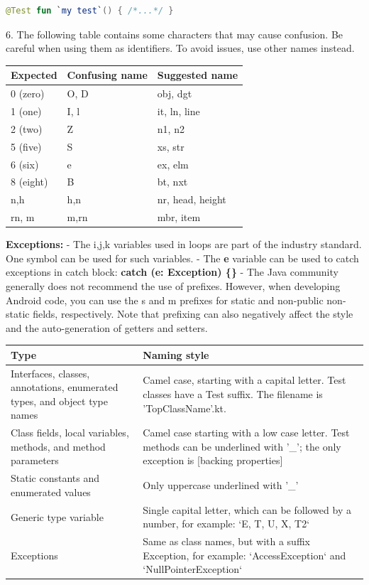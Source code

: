 \begin{lstlisting}[language=Kotlin]
 @Test fun `my test`() { /*...*/ }
\end{lstlisting}
6.  The following table contains some characters that may cause confusion. Be careful when using them as identifiers. To avoid issues, use other names instead.
\begin{center}
\begin{tabular}{ |p{5.0cm}|p{5.0cm}|p{5.0cm}| }
\hline
Expected&Confusing name&Suggested name\\
\hline
 0 (zero)      & O, D                     & obj, dgt         \\
 1 (one)       & I, l                     & it, ln, line     \\
 2 (two)       & Z                        & n1, n2           \\
 5 (five)      & S                        & xs, str          \\
 6 (six)       & e                        & ex, elm          \\
 8 (eight)     & B                        & bt, nxt          \\
 n,h           & h,n                      & nr, head, height \\
 rn, m         & m,rn                     & mbr, item        \\
\hline
\end{tabular}
\end{center}
\textbf{Exceptions:}
- The i,j,k variables used in loops are part of the industry standard. One symbol can be used for such variables.
- The \textbf{e} variable can be used to catch exceptions in catch block: \textbf{catch (e: Exception) \{\}}
- The Java community generally does not recommend the use of prefixes. However, when developing Android code, you can use the s and m prefixes for static and non-public non-static fields, respectively.
Note that prefixing can also negatively affect the style and the auto-generation of getters and setters.
\begin{center}
\begin{tabular}{ |p{7.5cm}|p{7.5cm}| }
\hline
Type&Naming style\\
\hline
 Interfaces, classes, annotations, enumerated types, and object type names & Camel case, starting with a capital letter. Test classes have a Test suffix. The filename is 'TopClassName'.kt.  \\
 Class fields, local variables, methods, and method parameters & Camel case starting with a low case letter. Test methods can be underlined with '\_'; the only exception is [backing properties]\\
 Static constants and enumerated values & Only uppercase underlined with '\_' \\
 Generic type variable & Single capital letter, which can be followed by a number, for example: `E, T, U, X, T2` \\
 Exceptions & Same as class names, but with a suffix Exception, for example: `AccessException` and `NullPointerException`\\
\hline
\end{tabular}
\end{center}
